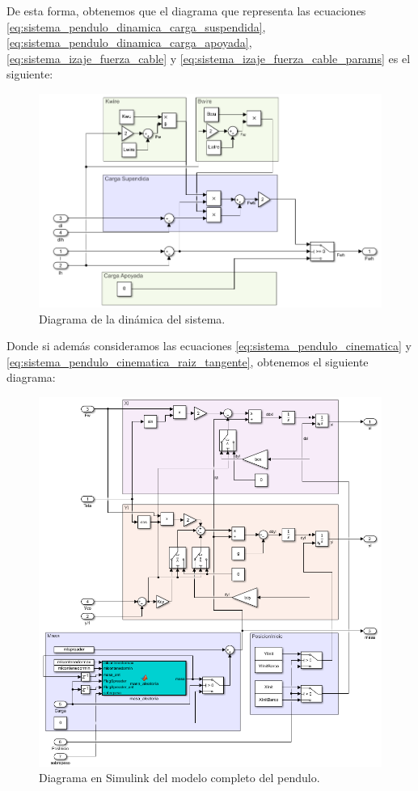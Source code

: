 \documentclass[11pt]{article}
\begin{document}
De esta forma, obtenemos que el diagrama que representa las ecuaciones \ref{eq:sistema_pendulo_dinamica_carga_suspendida}, \ref{eq:sistema_pendulo_dinamica_carga_apoyada}, \ref{eq:sistema_izaje_fuerza_cable} y \ref{eq:sistema_izaje_fuerza_cable_params} es el siguiente:

\begin{figure}[h!]
	\centering
	\includegraphics[width=1\textwidth]{images/imagen_9_sistema_pendulo_dinamica.png}
	\caption{Diagrama de la dinámica del sistema.}
	\label{fig:sistema_pendulo_dinamica}
\end{figure}

Donde si además consideramos las ecuaciones \ref{eq:sistema_pendulo_cinematica} y \ref{eq:sistema_pendulo_cinematica_raiz_tangente}, obtenemos el siguiente diagrama:

\begin{figure}[h!]
	\centering
	\includegraphics[width=1\textwidth]{images/imagen_10_sistema_pendulo_cinematica_dinamica.png}
	\caption{Diagrama en Simulink del modelo completo del pendulo.}
	\label{fig:sistema_pendulo_cinematica_dinamica}
\end{figure}
\end{document}
